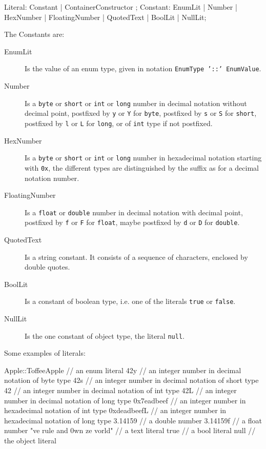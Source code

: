 \begin{rail}
  Literal: Constant | ContainerConstructor ;
  Constant: EnumLit | Number | HexNumber | FloatingNumber | QuotedText | BoolLit | NullLit;
\end{rail}\label{literaldef}

The Constants are:
\begin{description}
  \item[EnumLit] Is the value of an enum type, given in notation \texttt{EnumType '::' EnumValue}.
  \item[Number] Is a \texttt{byte} or \texttt{short} or \texttt{int} or \texttt{long} number in decimal notation without decimal point, postfixed by \texttt{y} or \texttt{Y} for \texttt{byte}, postfixed by \texttt{s} or \texttt{S} for \texttt{short}, postfixed by \texttt{l} or \texttt{L} for \texttt{long}, or of \texttt{int} type if not postfixed.
  \item[HexNumber] Is a \texttt{byte} or \texttt{short} or \texttt{int} or \texttt{long} number in hexadecimal notation starting with \texttt{0x}, the different types are distinguished by the suffix as for a decimal notation number.
  \item[FloatingNumber] Is a \texttt{float} or \texttt{double} number in decimal notation with decimal point, postfixed by \texttt{f} or \texttt{F} for \texttt{float}, maybe postfixed by \texttt{d} or \texttt{D} for \texttt{double}.
  \item[QuotedText] Is a string constant. It consists of a sequence of characters, enclosed by double quotes.
  \item[BoolLit] Is a constant of boolean type, i.e. one of the literals \texttt{true} or \texttt{false}.
  \item[NullLit] Is the one constant of object type, the literal \texttt{null}.
\end{description}

\begin{example}
Some examples of literals:
\begin{grgen}
Apple::ToffeeApple // an enum literal
42y // an integer number in decimal notation of byte type
42s // an integer number in decimal notation of short type
42 // an integer number in decimal notation of int type
42L // an integer number in decimal notation of long type
0x7eadbeef // an integer number in hexadecimal notation of int type
0xdeadbeefL // an integer number in hexadecimal notation of long type
3.14159 // a double number
3.14159f // a float number
"ve rule and 0wn ze vorld" // a text literal
true // a bool literal
null // the object literal
\end{grgen}
\end{example}

